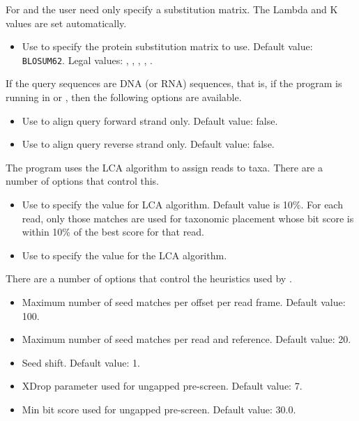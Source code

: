 \documentclass[11pt]{article}
\begin{document}
For  and  the user need only specify a substitution matrix. The Lambda and
K values are set automatically.
\begin{itemize}
\setlength{\itemindent}{30pt}
\item[\itt{--subMatrix}] Use to specify the protein substitution matrix to use. Default value: {\tt BLOSUM62}. Legal values: 
, , , , .
\end{itemize}

If the query sequences are DNA (or RNA) sequences, that is, if the program is running in  {}
or  , then the following options are available.
\begin{itemize}
\setlength{\itemindent}{30pt}
\item[\itt{--forwardOnly}]       Use to align query forward strand only. Default value: false.
\item[\itt{ --reverseOnly}]       Use to align query reverse strand only. Default value: false.
\end{itemize}

The program uses the LCA algorithm \cite{MEGAN2007} to assign reads to taxa. There are a number of
options that control this.
\begin{itemize}
\setlength{\itemindent}{30pt}
\item[\itt{--topPercent}]          Use to specify the  value for LCA algorithm. Default value is 10\%. For each read,
only those matches are used for taxonomic placement whose bit score is within 10\% of the best score for that read.
\item[\itt{--minSupport}]           Use to specify the  value for the LCA algorithm. 
\end{itemize}

There are a number of options that control the heuristics used by .
\begin{itemize}
\setlength{\itemindent}{30pt}
\item[{\itt{--maxSeedsPerFrame}}]   Maximum number of seed matches per offset per read frame. Default value: 100.
\item[{\itt{--maxSeedsPerRef}}]      Maximum number of seed matches per read and reference. Default value: 20.
\item[\itt{ --seedShift}]            Seed shift. Default value: 1.
\item[\itt{ --xDrop}]                XDrop parameter used for ungapped pre-screen. Default value: 7.
\item[\itt{--minBitPre}]            Min bit score used for ungapped pre-screen. Default value: 30.0.
\end{itemize}
\end{document}

